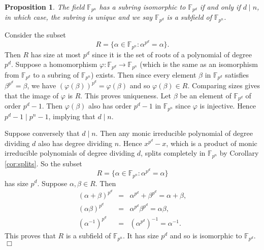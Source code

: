 \documentclass{article}
\def\F{{\mathbb F}}
\def\F{{\mathbb F}}
\newtheorem{proposition}[subsection]{Proposition}
\newenvironment{proof}{\noindent {\bf Proof:}}{$\Box$ \vspace{2 ex}}
\begin{document}
\begin{comment}
    Let $f_1(x),\ldots,f_N(x)$ denote all the monic irreducible polynomials of degree dividing $n$. Then for $i\neq j$, we have $f_i(x)\notin(f_j(x))$. Then we have the factorization
$$x^{p^n} - x = f_1(x)f_2(x)\cdots f_N(x)h(x)$$ 
for some $h(x)\in \F_p[x].$ Suppose for a contradiction that $h(x)$ has degree at least $1$. Let $g(x)$ be an irreducible factor of $h(x)$. Then $x^{p^n} - x \in (g(x))$ and so $g = f_i$ for some $i=1,\ldots,N$. So $x^{p^n} - x = f_i(x)^2g_i(x)$ for some $g_i(x)\in\F_p[x]$. However, the derivative of $x^{p^n} - x$ is $p^nx^{p^n-1} - 1 = -1$ in $\F_p[x]$ but the derivative of $f_i(x)^2g_i(x)$ is $2f_i(x)f_i'(x)g(x) + f_i(x)^2g_i'(x)$, which is divisible by $f_i$. Contradiction. Therefore, $h(x)$ has degree $0$ and thus must be $1$ since $f_1,\ldots,f_N$ are all monic.
\end{comment}
    
\begin{proposition}
    The field $\F_{p^n}$ has a subring isomorphic to $\F_{p^d}$ if and only if $d\mid n$, in which case, the subring is unique and we say $\F_{p^d}$ is a subfield of $\F_{p^n}$.
\end{proposition}

\begin{proof}
    Consider the subset $$R = \{\alpha\in\F_{p^n}\colon \alpha^{p^d} = \alpha\}.$$ Then $R$ has size at most $p^d$ since it is the set of roots of a polynomial of degree $p^d$. Suppose a homomorphism $\varphi:\F_{p^d}\rightarrow\F_{p^n}$ (which is the same as an isomorphism from $\F_{p^d}$ to a subring of $\F_{p^n}$) exists. Then since every element $\beta$ in $\F_{p^d}$ satisfies $\beta^{p^d} = \beta$, we have $(\varphi(\beta))^{p^d} = \varphi(\beta)$ and so $\varphi(\beta)\in R$. Comparing sizes gives that the image of $\varphi$ is $R$. This proves uniqueness. Let $\beta$ be an element of $\F_{p^d}$ of order $p^d - 1$. Then $\varphi(\beta)$ also has order $p^d - 1$ in $\F_{p^n}$ since $\varphi$ is injective. Hence $p^d - 1\mid p^n - 1$, implying that $d\mid n$.
    
    Suppose conversely that $d\mid n.$ Then any monic irreducible polynomial of degree dividing $d$ also has degree dividing $n$. Hence $x^{p^d} - x$, which is a product of monic irreducible polynomials of degree dividing $d$, splits completely in $\F_{p^n}$ by Corollary \ref{cor:splits}. So the subset $$R = \{\alpha\in\F_{p^n}\colon \alpha^{p^d} = \alpha\}$$ has size $p^d$. Suppose $\alpha,\beta\in R$. Then
    \begin{eqnarray*}
        (\alpha+\beta)^{p^d} &=& \alpha^{p^d} + \beta^{p^d} = \alpha + \beta,\\
        (\alpha\beta)^{p^d} &=& \alpha^{p^d}\beta^{p^d} = \alpha\beta,\\
        (\alpha^{-1})^{p^d} &=& (\alpha^{p^d})^{-1} = \alpha^{-1}.
    \end{eqnarray*}
    This proves that $R$ is a subfield of $\F_{p^n}$. It has size $p^d$ and so is isomorphic to $\F_{p^d}$. 
\end{proof}
\end{document}
